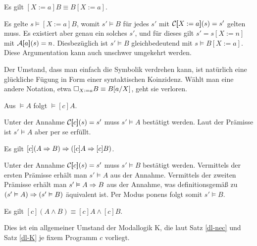 \begin{Satz}
Es gilt $[X:=a]B\equiv B[X:=a]$.
\end{Satz}
\begin{Beweis}
Es gelte $s\models [X:=a]B$, womit $s'\models B$ für jedes $s'$ mit
$\mathcal C[\hspace{-2.6pt}[X:=a]\hspace{-2.4pt}](s)=s'$ gelten muss. Es existiert aber genau ein
solches $s'$, und für dieses gilt $s'=s[X:=n]$ mit
$\mathcal A[\hspace{-2.6pt}[a]\hspace{-2.4pt}](s)=n$. Diesbezüglich ist $s'\models B$ gleichbedeutend
mit $s\models B[X:=a]$. Diese Argumentation kann auch
unschwer umgekehrt werden.\,\qedsymbol
\end{Beweis}

Der Umstand, dass man einfach die Symbolik verdrehen kann, ist natürlich
eine glückliche Fügung in Form einer syntaktischen Koinzidenz. Wählt man
eine andere Notation, etwa $\Box_{X:=a} B\equiv B[a/X]$, geht sie verloren.

\begin{Satz}\label{dl-nec}
Aus $\models A$ folgt $\models [c]A$.
\end{Satz}
\begin{Beweis}
Unter der Annahme $\mathcal C[\hspace{-2.6pt}[c]\hspace{-2.4pt}](s)=s'$ muss $s'\models A$ bestätigt
werden. Laut der Prämisse ist $s'\models A$ aber per se erfüllt.\,\qedsymbol
\end{Beweis}

\begin{Satz}\label{dl-K}
Es gilt $[c](A\Rightarrow B)\Rightarrow ([c]A\Rightarrow [c]B)$.
\end{Satz}
\begin{Beweis}
Unter der Annahme $\mathcal C[\hspace{-2.6pt}[c]\hspace{-2.4pt}](s)=s'$ muss $s'\models B$ bestätigt
werden. Vermittels der ersten Prämisse erhält man $s'\models A$ aus
der Annahme. Vermittels der zweiten Prämisse erhält man
$s'\vDash A\Rightarrow B$ aus der Annahme, was definitionsgemäß zu
$(s'\vDash A)\Rightarrow (s'\vDash B)$ äquivalent ist. Per Modus ponens
folgt somit $s'\models B$.\,\qedsymbol
\end{Beweis}

\begin{Satz}
Es gilt $[c](A\land B)\equiv [c]A\land [c]B$.
\end{Satz}
\begin{Beweis}
Dies ist ein allgemeiner Umstand der Modallogik K, die
laut Satz \ref{dl-nec} und Satz \ref{dl-K} je fixem Programm $c$
vorliegt.\,\qedsymbol
\end{Beweis}


